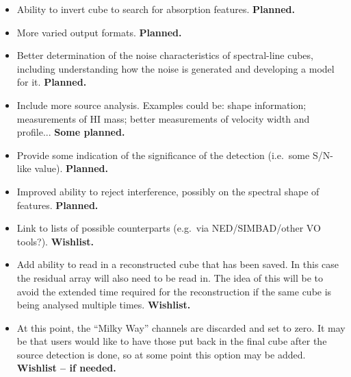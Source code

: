 \documentclass[12pt,a4paper]{article}
\newcommand{\eg}{e.g.\ }
\newcommand{\ie}{i.e.\ }
\begin{document}
\begin{itemize}

\item Ability to invert cube to search for absorption features. {\bf
  Planned.} 

\item More varied output formats. {\bf Planned.}

\item Better determination of the noise characteristics of
  spectral-line cubes, including understanding how the noise is
  generated and developing a model for it. {\bf Planned.}
  
\item Include more source analysis. Examples could be: shape
  information; measurements of HI mass; better measurements of
  velocity width and profile... {\bf Some planned.}

\item Provide some indication of the significance of the detection
  (\ie some S/N-like value). {\bf Planned.}

\item Improved ability to reject interference, possibly on the
  spectral shape of features. {\bf Planned.}

\item Link to lists of possible counterparts (\eg via NED/SIMBAD/other
  VO tools?). {\bf Wishlist.} 

\item Add ability to read in a reconstructed cube that has been
  saved. In this case the residual array will also need to be read
  in. The idea of this will be to avoid the extended time required for
  the reconstruction if the same cube is being analysed multiple
  times. {\bf Wishlist.}
 
\item At this point, the ``Milky Way'' channels are discarded and set
  to zero. It may be that users would like to have those put back in
  the final cube after the source detection is done, so at some point
  this option may be added. {\bf Wishlist -- if needed.}

\end{itemize}
\end{document}
